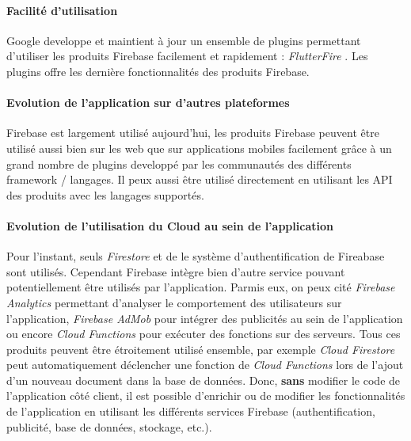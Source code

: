 \paragraph{Facilité d'utilisation}
Google developpe et maintient à jour un ensemble de plugins permettant d'utiliser les produits Firebase facilement et rapidement :  \textit{FlutterFire} \cite{flutterfire}. Les plugins offre les dernière fonctionnalités des produits Firebase.

\paragraph{Evolution de l'application sur d'autres plateformes}
Firebase est largement utilisé aujourd'hui, les produits Firebase peuvent être utilisé aussi bien sur les web que sur applications mobiles facilement grâce à un grand nombre de plugins developpé par les communautés des différents framework / langages. Il peux aussi être utilisé directement en utilisant les API des produits avec les langages supportés.

\paragraph{Evolution de l'utilisation du Cloud au sein de l'application}
Pour l'instant, seuls \textit{Firestore} et de le système d'authentification de Fireabase sont utilisés. Cependant Firebase intègre bien d'autre service pouvant potentiellement être utilisés par l'application. Parmis eux, on peux cité \textit{Firebase Analytics} permettant d'analyser le comportement des utilisateurs sur l'application, \textit{Firebase AdMob} pour intégrer des publicités au sein de l'application ou encore \textit{Cloud Functions} pour exécuter des fonctions sur des serveurs. Tous ces produits peuvent être étroitement utilisé ensemble, par exemple \textit{Cloud Firestore} peut automatiquement déclencher une fonction de  \textit{Cloud Functions} lors de l'ajout d'un nouveau document dans la base de données. Donc, \textbf{sans} modifier le code de l'application côté client, il est possible d'enrichir ou de modifier les fonctionnalités de l'application en utilisant les différents services Firebase (authentification, publicité, base de données, stockage, etc.).

